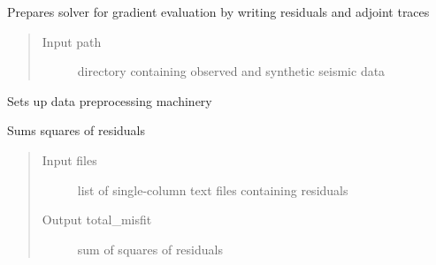 \documentclass[letterpaper,10pt,english]{sphinxmanual}
\begin{document}
\begin{fulllineitems}
\begin{fulllineitems}
\end{fulllineitems}


\begin{fulllineitems}
\label{\detokenize{ref/seisflows.preprocess:seisflows.preprocess.base.base.prepare_eval_grad}}
Prepares solver for gradient evaluation by writing residuals and
adjoint traces
\begin{quote}\begin{description}
\item[{Input path}] \leavevmode
directory containing observed and synthetic seismic data

\end{description}\end{quote}

\end{fulllineitems}


\begin{fulllineitems}
\label{\detokenize{ref/seisflows.preprocess:seisflows.preprocess.base.base.setup}}
Sets up data preprocessing machinery

\end{fulllineitems}


\begin{fulllineitems}
\label{\detokenize{ref/seisflows.preprocess:seisflows.preprocess.base.base.sum_residuals}}
Sums squares of residuals
\begin{quote}\begin{description}
\item[{Input files}] \leavevmode
list of single-column text files containing residuals

\item[{Output total\_misfit}] \leavevmode
sum of squares of residuals


\end{description}
\end{quote}
\end{fulllineitems}
\end{fulllineitems}
\end{document}
